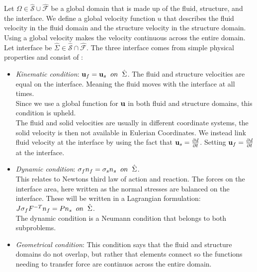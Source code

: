 Let $\Omega \in \hat{\mathcal{S}} \cup \hat{\mathcal{F}} $ be a global domain that is made up of the fluid, structure, and the interface. We define a global velocity function $u$ that describes the fluid velocity in the fluid domain and the structure velocity in the structure domain. Using a global velocity makes the velocity continuous across the entire domain. Let interface be $ \hat{\Sigma} \in \hat{\mathcal{S}} \cap \hat{\mathcal{F}}  $.\newline 
The three interface comes from simple physical properties and consist of \cite{Richter2016}:

\begin{itemize}
\item \textit{Kinematic condition}: $\bold{u}_f = \bold{u}_s  \hspace{2mm} on \hspace{2mm} \hat{\Sigma}$. The fluid and structure velocities are equal on the interface. Meaning the fluid moves with the interface at all times. \\
Since we use a global function for $\bold{u}$ in both fluid and structure domains, this condition is upheld.\\ 
The fluid and solid velocities are usually in different coordinate systems, the solid velocity is then not available in Eulerian Coordinates. We instead link fluid velocity at the interface by using the fact that $\bold{u}_s = \frac{\partial d}{\partial t}$. Setting $\bold{u}_f = \frac{\partial d}{\partial t}$ at the interface.

\item \textit{Dynamic condition}: $  \sigma_f n_f = \sigma_s n_s \hspace{2mm} on  \hspace{2mm}\hat{\Sigma}   $. \\
	This relates to Newtons third law of action and reaction. The forces on the interface area, here written as the normal stresses are balanced on the interface. These will be written in a Lagrangian formulation: \\
	$J\sigma_f F^{-T} n_f = P n_s \hspace{2mm} on  \hspace{2mm}\hat{\Sigma} $. \\
	The dynamic condition is a Neumann condition that belongs to both subproblems.
	
\item \textit{Geometrical condition}: This condition says that the fluid and structure domains do not overlap, but rather that elements connect so the functions needing to transfer force are continuos across the entire domain.
\end{itemize}



